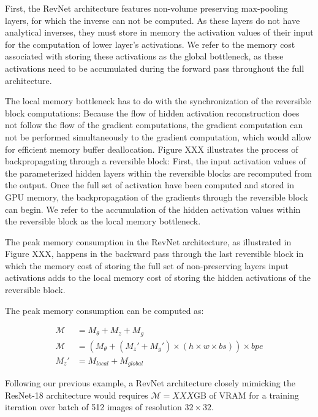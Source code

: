 \documentclass[twocolumn]{bmcart}
\begin{document}
First, the RevNet architecture features non-volume preserving max-pooling layers, for which the inverse can not be computed. 
As these layers do not have analytical inverses, they must store in memory the activation values of their input for the computation of lower layer's activations. 
We refer to the memory cost associated with storing these activations as the global bottleneck, as these activations need to be accumulated during the forward pass throughout the full architecture.

The local memory bottleneck has to do with the synchronization of the reversible block computations:
Because the flow of hidden activation reconstruction does not follow the flow of the gradient computations, 
the gradient computation can not be performed simultaneously to the gradient computation, 
which would allow for efficient memory buffer deallocation.
Figure XXX illustrates the process of backpropagating through a reversible block:
First, the input activation values of the parameterized hidden layers within the reversible blocks are recomputed from the output.
Once the full set of activation have been computed and stored in GPU memory, the backpropagation of the gradients through the reversible block can begin. 
We refer to the accumulation of the hidden activation values within the reversible block as the local memory bottleneck.

The peak memory consumption in the RevNet architecture, as illustrated in Figure XXX, happens in the backward pass through the last reversible block in which the memory cost of storing the full set of non-preserving layers input activations adds to the local memory cost of storing the hidden activations of the reversible block.

The peak memory consumption can be computed as:

\begin{subequations}
\begin{align}
\mathcal{M} &= M_{\theta} + M_{z} + M_{g} \\
\mathcal{M} &= (M_{\theta} + (M_z' + M_{g}') \times (h \times w \times bs)) \times bpe \\
M_z' &= M_{local} + M_{global}
\end{align}
\end{subequations}

Following our previous example, a RevNet architecture closely mimicking the ResNet-18 architecture
would requires $\mathcal{M}=XXX$GB of VRAM for a training iteration over batch of 512 images of resolution $32 \times 32$.
\end{document}
